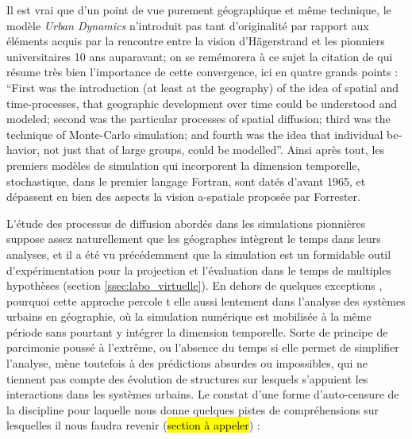 Il est vrai que d'un point de vue purement géographique et même technique, le modèle \textit{Urban Dynamics} n'introduit pas tant d'originalité par rapport aux éléments acquis par la rencontre entre la vision d'Hägerstrand et les pionniers universitaires 10 ans auparavant; on se remémorera à ce sujet la citation de \textcite{Morril2005} qui résume très bien l'importance de cette convergence, ici en quatre grands points : \foreignquote{english}{First was the introduction (at least at the geography) of the idea of spatial and time-processes, that geographic development over time could be understood and modeled; second was the particular processes of spatial diffusion; third was the technique of Monte-Carlo simulation; and fourth was the idea that individual behavior, not just that of large groups, could be modelled}. Ainsi après tout, les premiers modèles de simulation qui incorporent la dimension temporelle, stochastique, dans le premier langage Fortran, sont datés d'avant 1965, et dépassent en bien des aspects la vision a-spatiale proposée par Forrester.

L'étude des processus de diffusion abordés dans les simulations pionnières suppose assez naturellement que les géographes intègrent le temps dans leurs analyses, et il a été vu précédemment que la simulation est un formidable outil d'expérimentation pour la projection et l'évaluation dans le temps de multiples hypothèses (section \ref{ssec:labo_virtuelle}). En dehors de quelques exceptions , pourquoi cette approche percole t elle aussi lentement dans l'analyse des systèmes urbains en géographie, où la simulation numérique est mobilisée à la même période sans pourtant y intégrer la dimension temporelle. Sorte de principe de parcimonie poussé à l'extrême, ou l'absence du temps si elle permet de simplifier l'analyse, mène toutefois à des prédictions absurdes ou impossibles, qui ne tiennent pas compte des évolution de structures sur lesquels s'appuient les interactions dans les systèmes urbains. Le constat d'une forme d'auto-censure de la discipline pour laquelle \textcite[296-297]{Batty1976} nous donne quelques pistes de compréhensions sur lesquelles il nous faudra revenir (\hl{section à appeler}) :

